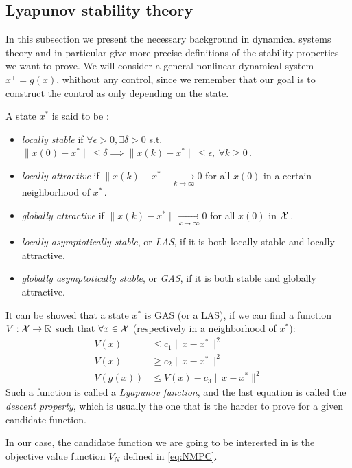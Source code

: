 \documentclass[12pt]{article}
\begin{document}
\subsection{Lyapunov stability theory}\label{sec:Lyapunov-stability-theory}
In this subsection we present the necessary background in dynamical systems theory and in particular give more precise definitions of the stability properties we want to prove.
We will consider a general nonlinear dynamical system $x^+=g(x)$, whithout any control, since we remember that our goal is to construct the control as only depending on the state.

A state $x^*$ is said to be :
\begin{itemize}[label=\textbullet]
	\item \textit{locally stable} if $\forall\epsilon>0,\exists \delta>0$ s.t. $\|x(0)-x^*\|\leq\delta\implies\|x(k)-x^*\|\leq\epsilon,~\forall k\geq 0$\,.
	\item \textit{locally attractive} if $\|x(k)-x^*\|\underset{k\to\infty}{\longrightarrow}0$ for all $x(0)$ in a certain neighborhood of $x^*$\,.
	\item \textit{globally attractive} if $\|x(k)-x^*\|\underset{k\to\infty}{\longrightarrow}0$ for all $x(0)$ in $\cal{X}$\,.
	\item \textit{locally asymptotically stable}, or \textit{LAS}, if it is both locally stable and locally attractive.
	\item \textit{globally asymptotically stable}, or \textit{GAS}, if it is both stable and globally attractive.
\end{itemize}

It can be showed that a state $x^*$ is GAS (or a LAS), if we can find a function $V:\cal{X}\to\R$ such that $\forall x\in\cal{X}$ (respectively in a neighborhood of $x^*$):
\begin{align*}
	V(x)&\leq c_1\|x-x^*\|^2\\
	V(x)&\geq c_2\|x-x^*\|^2\\
	V(g(x))&\leq V(x)-c_3\|x-x^*\|^2
\end{align*}
Such a function is called a \textit{Lyapunov function}, and the last equation is called the \textit{descent property}, which is usually the one that is the harder to prove for a given candidate function.

\vspace{12pt}

In our case, the candidate function we are going to be interested in is the objective value function $V_N$ defined in \ref{eq:NMPC}.
\end{document}
